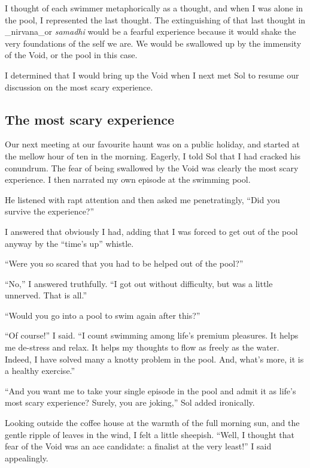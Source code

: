 \documentclass[
  a4paper,
]{article}
\begin{document}
I thought of each swimmer metaphorically as a thought, and when I was
alone in the pool, I represented the last thought. The extinguishing of
that last thought in \_nirvana\_or \emph{samadhi} would be a fearful
experience because it would shake the very foundations of the self we
are. We would be swallowed up by the immensity of the Void, or the pool
in this case.

I determined that I would bring up the Void when I next met Sol to
resume our discussion on the most scary experience.

\hypertarget{the-most-scary-experience}{%
\subsection{The most scary experience}\label{the-most-scary-experience}}

Our next meeting at our favourite haunt was on a public holiday, and
started at the mellow hour of ten in the morning. Eagerly, I told Sol
that I had cracked his conundrum. The fear of being swallowed by the
Void was clearly the most scary experience. I then narrated my own
episode at the swimming pool.

He listened with rapt attention and then asked me penetratingly, ``Did
you survive the experience?''

I answered that obviously I had, adding that I was forced to get out of
the pool anyway by the ``time's up'' whistle.

``Were you so scared that you had to be helped out of the pool?''

``No,'' I answered truthfully. ``I got out without difficulty, but was a
little unnerved. That is all.''

``Would you go into a pool to swim again after this?''

``Of course!'' I said. ``I count swimming among life's premium
pleasures. It helps me de-stress and relax. It helps my thoughts to flow
as freely as the water. Indeed, I have solved many a knotty problem in
the pool. And, what's more, it is a healthy exercise.''

``And you want me to take your single episode in the pool and admit it
as life's most scary experience? Surely, you are joking,'' Sol added
ironically.

Looking outside the coffee house at the warmth of the full morning sun,
and the gentle ripple of leaves in the wind, I felt a little sheepish.
``Well, I thought that fear of the Void was an ace candidate: a finalist
at the very least!'' I said appealingly.
\end{document}
